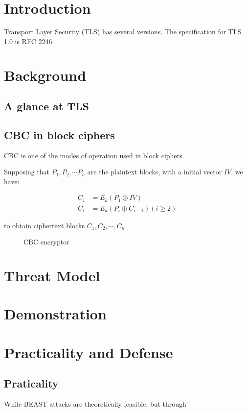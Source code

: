 \documentclass{acm_proc_article-sp}
\begin{document}

\section{Introduction}
Transport Layer Security (TLS) has several versions. The specification for TLS
1.0 is RFC 2246\cite{rfc2246}.

\section{Background}
\subsection{A glance at TLS}
\subsection{CBC in block ciphers}
CBC is one of the modes of operation used in block ciphers.

Supposing that $P_1,P_2,\cdots P_n$ are the plaintext blocks, with a initial vector $IV$, we have:

$$
\begin{aligned}
C_1&=E_k(P_1\oplus IV)\\
C_i&=E_k(P_{i}\oplus C_{i-1}) (i\geq 2)
\end{aligned}
$$

to obtain ciphertext blocks $C_1,C_2,\cdots,C_n$.

\begin{figure}[htb]
  \centering
  
  \caption{CBC encryptor}
\end{figure}
\section{Threat Model}

\section{Demonstration}
\section{Practicality and Defense}
\subsection{Praticality}
While BEAST attacks are theoretically feasible, but through
\end{document}
